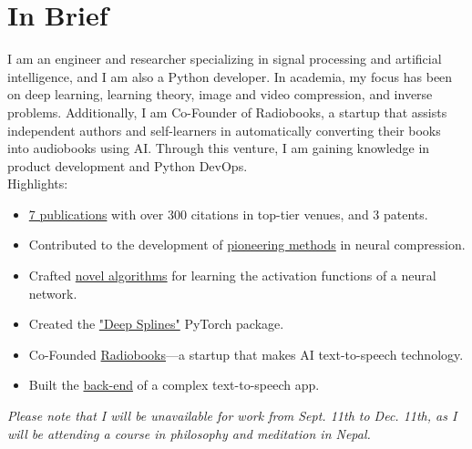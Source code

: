 \documentclass[a4paper,11pt]{article}
\begin{document}
  \vspace{16pt}

  \section{In Brief}
    I am an engineer and researcher specializing in signal processing and artificial intelligence, and I am also a Python developer. In academia, my focus has been on deep learning, learning theory, image and video compression, and inverse problems. Additionally, I am Co-Founder of Radiobooks, a startup that assists independent authors and self-learners in automatically converting their books into audiobooks using AI. Through this venture, I am gaining knowledge in product development and Python DevOps.
    \\[10pt]
    Highlights:
    \\[-20pt]
    \begin{itemize}[leftmargin=*,noitemsep]
      \item \href{https://www.joaquimcampos.com/pubs.html}{7 publications} with over 300 citations in top-tier venues, and 3 patents.
      \item Contributed to the development of \href{https://www.joaquimcampos.com/compression.html}{pioneering methods} in neural compression.
      \item Crafted \href{https://www.joaquimcampos.com/deepsplines.html}{novel algorithms} for
      learning the activation functions of a neural network.
      \item Created the \href{https://pypi.org/project/deepsplines/}{"Deep Splines"} PyTorch package.
      \item Co-Founded \href{https://radiobooks.webflow.io/}{Radiobooks}—a startup that makes AI text-to-speech technology.
      \item Built the \href{https://github.com/joaquimcampos/radiobooks-sample}{back-end} of a complex text-to-speech app.
    \end{itemize}

    \emph{Please note that I will be unavailable for work from Sept. 11th to Dec. 11th, as I will be attending a course in philosophy and meditation in Nepal.}

  \vspace{12pt}
\end{document}

